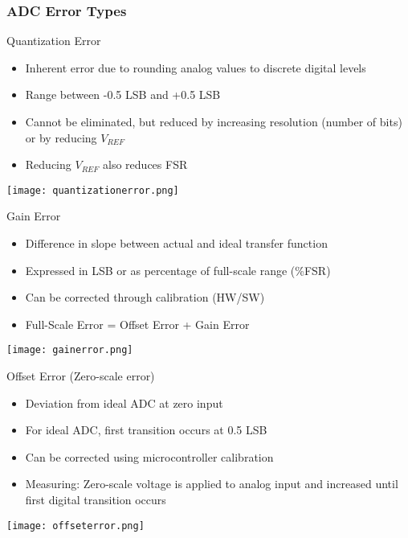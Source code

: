 \subsubsection{ADC Error Types}


\begin{concept}{Quantization Error}
\begin{itemize}
    \item Inherent error due to rounding analog values to discrete digital levels
    \item Range between -0.5 LSB and +0.5 LSB
    \item Cannot be eliminated, but reduced by increasing resolution (number of bits) or by reducing $V_{REF}$
    \item Reducing $V_{REF}$ also reduces FSR
\end{itemize}
\texttt{[image: quantizationerror.png]}
\end{concept}



\begin{concept}{Gain Error}
\begin{itemize}
    \item Difference in slope between actual and ideal transfer function
    \item Expressed in LSB or as percentage of full-scale range (\%FSR)
    \item Can be corrected through calibration (HW/SW)
    \item Full-Scale Error = Offset Error + Gain Error
\end{itemize}

\texttt{[image: gainerror.png]}
\end{concept}

\begin{concept}{Offset Error} (Zero-scale error)
\begin{itemize}
    \item Deviation from ideal ADC at zero input
    \item For ideal ADC, first transition occurs at 0.5 LSB
    \item Can be corrected using microcontroller calibration
    \item Measuring: Zero-scale voltage is applied to analog input and increased until first digital transition occurs
\end{itemize}
\texttt{[image: offseterror.png]}
\end{concept}

